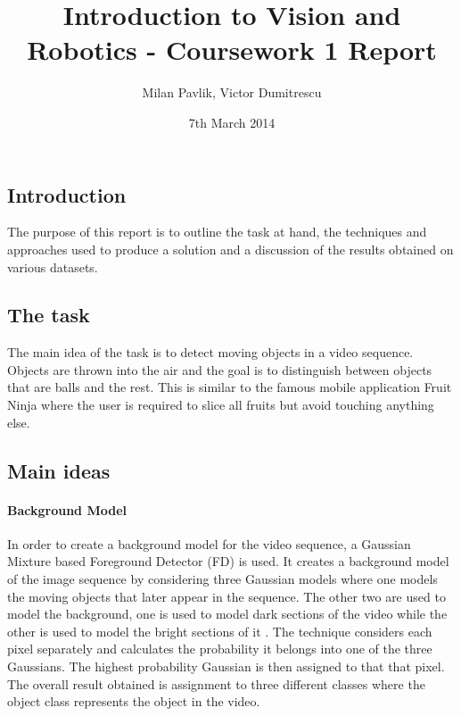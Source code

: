 \documentclass[10pt,a4paper]{article}
\title{Introduction to Vision and Robotics - Coursework 1 Report}
\author{Milan Pavlik, Victor Dumitrescu}
\date{7th March 2014}
\begin{document}
\maketitle  %
%

\begin{multicols}{2}

\section{Introduction}

The purpose of this report is to outline the task at hand, the techniques and approaches used to produce a solution and a discussion of the results obtained on various datasets.

\subsection{The task}

The main idea of the task is to detect moving objects in a video sequence. Objects are thrown into the air and the goal is to distinguish between objects that are balls and the rest. This is similar to the famous mobile application Fruit Ninja where the user is required to slice all fruits but avoid touching anything else.



\subsection{Main ideas}

\paragraph{Background Model}
In order to create a background model for the video sequence, a Gaussian Mixture based Foreground Detector (FD) is used. It creates a background model of the image sequence by considering three Gaussian models where one models the moving objects that later appear in the sequence. The other two are used to model the background, one is used to model dark sections of the video while the other is used to model the bright sections of it \cite{ES1}.
The technique considers each pixel separately and calculates the probability it belongs into one of the three Gaussians. The highest probability Gaussian is then assigned to that that pixel. The overall result obtained is assignment to three different classes where the object class represents the object in the video. 


\end{multicols}
\end{document}
